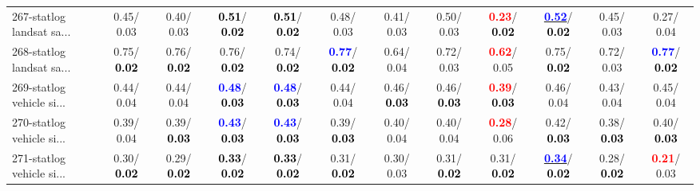 \begin{table}[h]
\begin{center}
{\begin{tabular}{lc|c|c|c|c|c|c|c|c|c|c}
267-statlog landsat sa... &   0.45/  0.03 &   0.40/  0.03 & \textcolor{black}{\textbf{  0.51}}/\textcolor{black}{\textbf{  0.02}} & \textcolor{black}{\textbf{  0.51}}/\textcolor{black}{\textbf{  0.02}} &   0.48/  0.03 &   0.41/  0.03 &   0.50/  0.03 & \textcolor{red}{\textbf{  0.23}}/\textcolor{black}{\textbf{  0.02}} & \underline{\textcolor{blue}{\textbf{  0.52}}}/\textcolor{black}{\textbf{  0.02}} &   0.45/  0.03 &   0.27/  0.04 \\
268-statlog landsat sa... &   0.75/\textcolor{black}{\textbf{  0.02}} &   0.76/\textcolor{black}{\textbf{  0.02}} &   0.76/\textcolor{black}{\textbf{  0.02}} &   0.74/\textcolor{black}{\textbf{  0.02}} & \textcolor{blue}{\textbf{  0.77}}/\textcolor{black}{\textbf{  0.02}} &   0.64/  0.04 &   0.72/  0.03 & \textcolor{red}{\textbf{  0.62}}/  0.05 &   0.75/\textcolor{black}{\textbf{  0.02}} &   0.72/  0.03 & \textcolor{blue}{\textbf{  0.77}}/\textcolor{black}{\textbf{  0.02}} \\
269-statlog vehicle si... &   0.44/  0.04 &   0.44/  0.04 & \textcolor{blue}{\textbf{  0.48}}/\textcolor{black}{\textbf{  0.03}} & \textcolor{blue}{\textbf{  0.48}}/\textcolor{black}{\textbf{  0.03}} &   0.44/  0.04 &   0.46/\textcolor{black}{\textbf{  0.03}} &   0.46/\textcolor{black}{\textbf{  0.03}} & \textcolor{red}{\textbf{  0.39}}/\textcolor{black}{\textbf{  0.03}} &   0.46/  0.04 &   0.43/  0.04 &   0.45/  0.04 \\
270-statlog vehicle si... &   0.39/  0.04 &   0.39/\textcolor{black}{\textbf{  0.03}} & \textcolor{blue}{\textbf{  0.43}}/\textcolor{black}{\textbf{  0.03}} & \textcolor{blue}{\textbf{  0.43}}/\textcolor{black}{\textbf{  0.03}} &   0.39/\textcolor{black}{\textbf{  0.03}} &   0.40/  0.04 &   0.40/  0.04 & \textcolor{red}{\textbf{  0.28}}/  0.06 &   0.42/\textcolor{black}{\textbf{  0.03}} &   0.38/\textcolor{black}{\textbf{  0.03}} &   0.40/\textcolor{black}{\textbf{  0.03}} \\ \hline
271-statlog vehicle si... &   0.30/\textcolor{black}{\textbf{  0.02}} &   0.29/\textcolor{black}{\textbf{  0.02}} & \textcolor{black}{\textbf{  0.33}}/\textcolor{black}{\textbf{  0.02}} & \textcolor{black}{\textbf{  0.33}}/\textcolor{black}{\textbf{  0.02}} &   0.31/\textcolor{black}{\textbf{  0.02}} &   0.30/  0.03 &   0.31/\textcolor{black}{\textbf{  0.02}} &   0.31/\textcolor{black}{\textbf{  0.02}} & \underline{\textcolor{blue}{\textbf{  0.34}}}/\textcolor{black}{\textbf{  0.02}} &   0.28/\textcolor{black}{\textbf{  0.02}} & \textcolor{red}{\textbf{  0.21}}/  0.03 \\

\end{tabular}}
\end{center}
\end{table}
